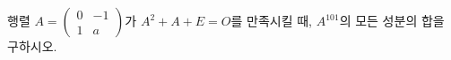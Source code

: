 행렬 $A=\begin{pmatrix} 0 & -1 \\ 1 & a \end{pmatrix}$가 $A^2+A+E=O$를 만족시킬 때, $A^{101}$의 모든 성분의 합을 구하시오. 
